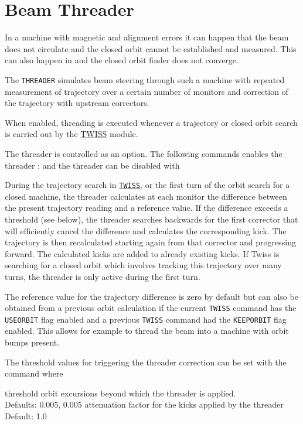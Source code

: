 %

\section{Beam Threader}
\label{sec:threader}

In a machine with magnetic and alignment errors it can happen that the
beam does not circulate and the closed orbit cannot be established and
measured. This can also happen in \madx and the closed orbit finder does
not converge. 

The {\tt THREADER} simulates beam steering through such a machine
with repeated measurement of trajectory over a certain number of
monitors and correction of the trajectory with upstream correctors.   

When enabled, threading is executed whenever a trajectory or closed
orbit search is carried out by the \hyperref[chap:twiss]{TWISS}
module.   

The threader is controlled as an option. 
The following \madx commands enables the threader :
and the threader can be disabled with

During the trajectory search in \hyperref[chap:twiss]{\tt TWISS}, or the first 
turn of the orbit search for a closed machine, the threader calculates at each
monitor the difference between the present trajectory reading and a
reference value.
If the difference exceeds a threshold (see below), the threader searches
backwards for the first corrector that will efficiently cancel the
difference and calculates the corresponding kick. The trajectory is then
recalculated starting again from that corrector and progressing
forward. The calculated kicks are added to already existing kicks. If
Twiss is searching for a closed orbit which involves tracking this
trajectory over many turns, the threader is only active during the first
turn.  

The reference value for the trajectory difference is zero by default but
can also be obtained from a previous orbit calculation if the current
{\tt TWISS} command has the {\tt USEORBIT} flag enabled and a previous
{\tt TWISS} command had the {\tt KEEPORBIT} flag enabled. This allows
for example to thread the beam into a machine with orbit bumps present.  

The threshold values for triggering the threader correction can be set
with the command  
where 
\begin{madlist}
   threshold orbit excursions beyond which the threader
  is applied. \\ Defaults: 0.005, 0.005
   attenuation factor for the kicks applied by the threader
  \\ Default: 1.0 
\end{madlist}

